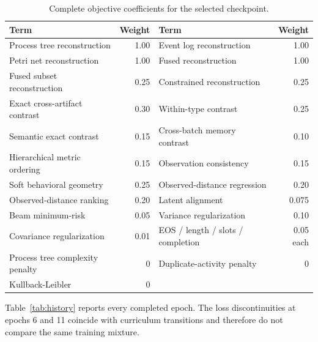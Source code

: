 \documentclass[applsci,supfile,submit,pdftex,moreauthors]{Definitions/mdpi}
\begin{document}
\begin{table}[H]
\centering
\caption{Complete objective coefficients for the selected checkpoint.}
\label{tab:loss-weights}
\begin{tabularx}{\textwidth}{@{}Yr@{\qquad}Yr@{}}
\toprule
Term & Weight & Term & Weight \\
\midrule
Process tree reconstruction & 1.00 & Event log reconstruction & 1.00 \\
Petri net reconstruction & 1.00 & Fused reconstruction & 1.00 \\
Fused subset reconstruction & 0.25 & Constrained reconstruction & 0.25 \\
Exact cross-artifact contrast & 0.30 & Within-type contrast & 0.25 \\
Semantic exact contrast & 0.15 & Cross-batch memory contrast & 0.10 \\
Hierarchical metric ordering & 0.15 & Observation consistency & 0.15 \\
Soft behavioral geometry & 0.25 & Observed-distance regression & 0.20 \\
Observed-distance ranking & 0.20 & Latent alignment & 0.075 \\
Beam minimum-risk & 0.05 & Variance regularization & 0.10 \\
Covariance regularization & 0.01 & EOS / length / slots / completion & 0.05 each \\
Process tree complexity penalty & 0 & Duplicate-activity penalty & 0 \\
Kullback-Leibler & 0 & & \\
\bottomrule
\end{tabularx}
\end{table}

Table~\ref{tab:history} reports every completed epoch. The loss discontinuities at epochs 6 and 11 coincide with curriculum transitions and therefore do not compare the same training mixture.
\end{document}
